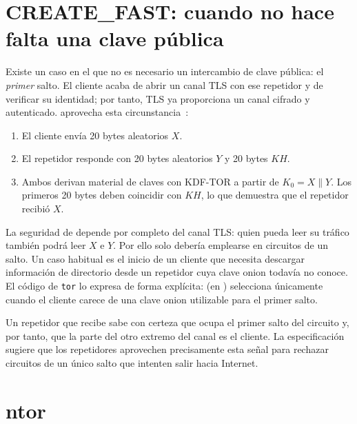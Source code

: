 \section{CREATE\_FAST: cuando no hace falta una clave pública}\label{sec:create-fast}

Existe un caso en el que no es necesario un intercambio de clave pública: el \emph{primer} salto. El cliente acaba de abrir un canal TLS con ese repetidor y de verificar su identidad; por tanto, TLS ya proporciona un canal cifrado y autenticado.  aprovecha esta circunstancia~:
\begin{enumerate}
  \item El cliente envía 20 bytes aleatorios $X$.
  \item El repetidor responde con 20 bytes aleatorios $Y$ y 20 bytes $KH$.
  \item Ambos derivan material de claves con KDF-TOR a partir de $K_0 = X \| Y$. Los primeros 20 bytes deben coincidir con $KH$, lo que demuestra que el repetidor recibió $X$.
\end{enumerate}

La seguridad de  depende por completo del canal TLS: quien pueda leer su tráfico también podrá leer $X$ e $Y$. Por ello solo debería emplearse en circuitos de un salto. Un caso habitual es el inicio de un cliente que necesita descargar información de directorio desde un repetidor cuya clave onion todavía no conoce. El código de \texttt{tor} lo expresa de forma explícita:  (en ) selecciona  únicamente cuando el cliente carece de una clave onion utilizable para el primer salto.

\begin{attenzione}
Un repetidor que recibe  sabe con certeza que ocupa el primer salto del circuito y, por tanto, que la parte del otro extremo del canal es el cliente. La especificación sugiere que los repetidores aprovechen precisamente esta señal para rechazar circuitos de un único salto que intenten salir hacia Internet.
\end{attenzione}

\section{ntor}\label{sec:ntor}

